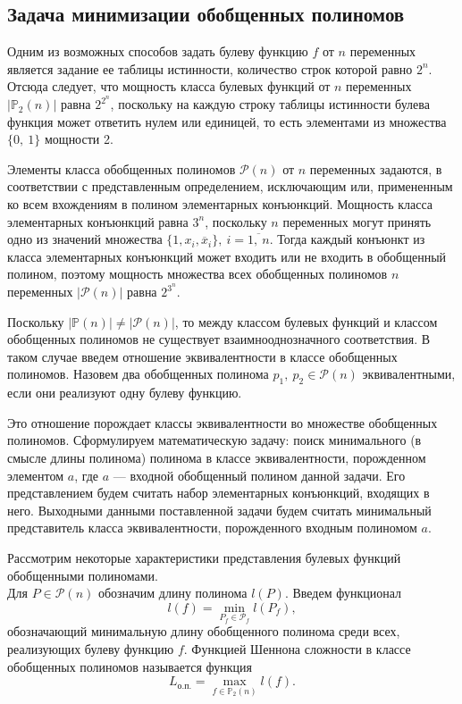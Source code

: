 \documentclass[a4paper,12pt,titlepage,finall]{article}
\begin{document}
\subsection{Задача минимизации обобщенных полиномов}

Одним из возможных способов задать булеву функцию $ f $ от $ n $ переменных является задание ее таблицы истинности, количество строк которой равно $ 2^n $. Отсюда следует, что мощность класса булевых функций от $ n $ переменных $ \left| \mathbb{P}_2(n) \right| $ равна $ 2^{2^n} $, поскольку на каждую строку таблицы истинности булева функция может ответить нулем или единицей, то есть элементами из множества $ \{ 0,\ 1 \} $ мощности 2.

Элементы класса обобщенных полиномов $ \mathcal{P}(n) $ от $ n $ переменных задаются, в соответствии с представленным определением, исключающим или, примененным ко всем вхождениям в полином элементарных конъюнкций. Мощность класса элементарных конъюнкций равна $ 3^n $, поскольку $ n $ переменных могут принять одно из значений множества $ \{ 1, x_i, \overline x_i \},\ i = \overline{1,\ n} $. Тогда каждый конъюнкт из класса элементарных конъюнкций может входить или не входить в обобщенный полином, поэтому мощность множества всех обобщенных полиномов $ n $ переменных $ \left| \mathcal{P}(n) \right| $ равна $ 2^{3^n} $.

Поскольку $ \left| \mathbb{P}(n) \right| \ne \left| \mathcal{P}(n) \right| $, то между классом булевых функций и классом обобщенных полиномов не существует взаимнооднозначного соответствия. В таком случае введем отношение эквивалентности в классе обобщенных полиномов. Назовем два обобщенных полинома $ p_1,\ p_2 \in \mathcal{P}(n) $ эквивалентными, если они реализуют одну булеву функцию.

Это отношение порождает классы эквивалентности во множестве обобщенных полиномов. Сформулируем математическую задачу: поиск минимального (в смысле длины полинома) полинома в классе эквивалентности, порожденном элементом $ a $, где $ a $ --- входной обобщенный полином данной задачи. Его представлением будем считать набор элементарных конъюнкций, входящих в него. Выходными данными поставленной задачи будем считать минимальный представитель класса эквивалентности, порожденного входным полиномом $ a $.

Рассмотрим некоторые характеристики представления булевых функций обобщенными полиномами.\\
Для $ P \in \mathcal{P}(n) $ обозначим длину полинома $ l(P) $. Введем функционал
$$ l(f) = \min\limits_{P_f \in \mathcal{P}_f} l(P_f), $$
обозначающий минимальную длину обобщенного полинома среди всех, реализующих булеву функцию $ f $. Функцией Шеннона сложности в классе обобщенных полиномов называется функция
$$ L_\text{о.п.} = \max\limits_{f \in \mathbb{P}_2(n)} l(f). $$
\end{document}
